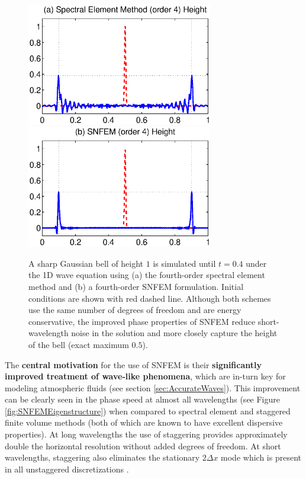\documentclass[11pt]{article}
\begin{document}
\begin{figure}[t]
\begin{center}
\includegraphics[width=3.2in]{SimulatedBell_SE}
\includegraphics[width=3.2in]{SimulatedBell_SNFEM}
\end{center}
\caption{A sharp Gaussian bell of height $1$ is simulated until $t = 0.4$ under the 1D wave equation using (a) the fourth-order spectral element method and (b) a fourth-order SNFEM formulation.  Initial conditions are shown with red dashed line.  Although both schemes use the same number of degrees of freedom and are energy conservative, the improved phase properties of SNFEM reduce short-wavelength noise in the solution and more closely capture the height of the bell (exact maximum $0.5$).}  \label{fig:SimulatedBell}
\end{figure}

The \textbf{central motivation} for the use of SNFEM is their \textbf{significantly improved treatment of wave-like phenomena}, which are in-turn key for modeling atmospheric fluids (see section \ref{sec:AccurateWaves}).  This improvement can be clearly seen in the phase speed at almost all wavelengths (see Figure \ref{fig:SNFEMEigenstructure}) when compared to spectral element and staggered finite volume methods (both of which are known to have excellent dispersive properties).  At long wavelengths the use of staggering provides approximately double the horizontal resolution without added degrees of freedom.  At short wavelengths, staggering also eliminates the stationary $2 \Delta x$ mode which is present in all unstaggered discretizations \cite{melvin2012dispersion, ullrich2014understanding}.
\end{document}
